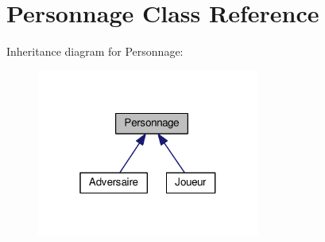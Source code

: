 \hypertarget{class_personnage}{}\section{Personnage Class Reference}
\label{class_personnage}


Inheritance diagram for Personnage\+:
\nopagebreak
\begin{figure}[H]
\begin{center}
\leavevmode
\includegraphics[width=208pt]{class_personnage__inherit__graph}
\end{center}
\end{figure}
